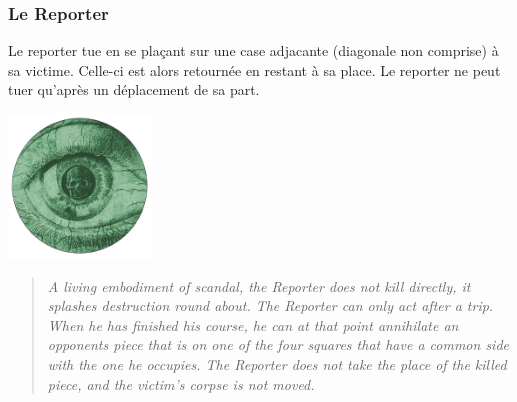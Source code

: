 \documentclass{article}
\begin{document}
\subsubsection{Le Reporter}
Le reporter tue en se plaçant sur une case adjacante (diagonale non comprise) à sa victime. Celle-ci est alors retournée en restant à sa place. 
Le reporter ne peut tuer qu'après un déplacement de sa part.


\vspace{5pt} %
\noindent %
\begin{minipage}{0.3\textwidth} %
\includegraphics[width=1.5in,height=1.5in]{media/image11.png}
\end{minipage}%
\hfill %
\begin{minipage}{0.75\textwidth} %

\begin{quote}
\textit{A living embodiment of scandal, the Reporter does not kill directly, it
splashes destruction round about. The Reporter can only act after a
trip. When he has finished his course, he can at that point annihilate
an opponent\textquotesingle s piece that is on one of the four squares
that have a common side with the one he occupies. The Reporter does not
take the place of the killed piece, and the victim's corpse is not
moved.}
\end{quote}
\end{minipage}
\end{document}
